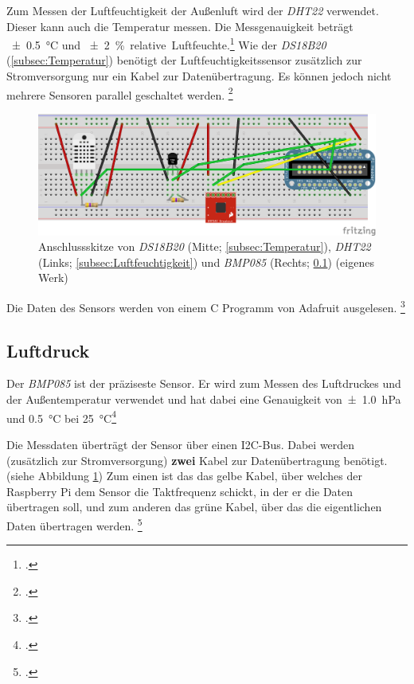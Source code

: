 Zum Messen der Luftfeuchtigkeit der Außenluft wird der \textit{DHT22} verwendet. Dieser kann auch die Temperatur messen. Die Messgenauigkeit beträgt \SI{\pm 0.5}{\degreeCelsius} und \SI{\pm 2}{\% .relative.Luftfeuchte}.\footcite{DHT22}
Wie der \textit{DS18B20} (\ref{subsec:Temperatur}) benötigt der Luftfeuchtigkeitssensor zusätzlich zur Stromversorgung nur ein Kabel zur Datenübertragung. Es können jedoch nicht mehrere Sensoren parallel geschaltet werden. \footcite[Wiring]{DHT}

\begin{figure}
  \centering
     \includegraphics[width=\textwidth]{figures/steckbrett.png}
  \caption{Anschlussskitze von \textit{DS18B20} (Mitte; \ref{subsec:Temperatur}), \textit{DHT22} (Links; \ref{subsec:Luftfeuchtigkeit}) und \textit{BMP085} (Rechts; \ref{subsec:Luftdruck}) (eigenes Werk)}
  \label{fig:steckbrett}
\end{figure}

Die Daten des Sensors werden von einem \gls{C} Programm von Adafruit ausgelesen.
\footcite[Software Install]{DHT}

\subsection{Luftdruck}
\label{subsec:Luftdruck}

Der \textit{BMP085} ist der präziseste Sensor. Er wird zum Messen des Luftdruckes und der Außentemperatur verwendet und hat dabei eine Genauigkeit von\SI{\pm 1.0}{\hecto\pascal} und \SI{0.5}{\degreeCelsius} bei \SI{25}{\degreeCelsius}\footcite[6]{BMP085}

Die Messdaten überträgt der Sensor über einen \gls{I2C}-Bus. Dabei werden (zusätzlich zur Stromversorgung) \textbf{zwei} Kabel zur Datenübertragung benötigt. (siehe Abbildung \ref{fig:steckbrett})
Zum einen ist das das gelbe Kabel, über welches der Raspberry Pi dem Sensor die Taktfrequenz schickt, in der er die Daten übertragen soll, und zum anderen das grüne Kabel, über das die eigentlichen Daten übertragen werden.
\footcite[Hooking Everything Up]{bmp058_adafruit}

